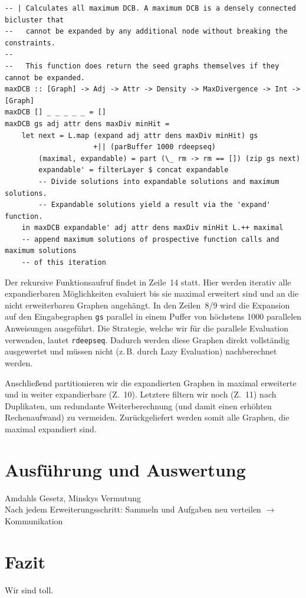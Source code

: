 \documentclass[a4paper]{scrartcl}
\begin{document}
\begin{lstlisting}[caption={Die maxDCB-Funktion},label=lst:maxDCB]
-- | Calculates all maximum DCB. A maximum DCB is a densely connected bicluster that
--   cannot be expanded by any additional node without breaking the constraints.
--   
--   This function does return the seed graphs themselves if they cannot be expanded.
maxDCB :: [Graph] -> Adj -> Attr -> Density -> MaxDivergence -> Int -> [Graph]
maxDCB [] _ _ _ _ _ = []
maxDCB gs adj attr dens maxDiv minHit =
    let next = L.map (expand adj attr dens maxDiv minHit) gs
                     +|| (parBuffer 1000 rdeepseq)
        (maximal, expandable) = part (\_ rm -> rm == []) (zip gs next)
        expandable' = filterLayer $ concat expandable
        -- Divide solutions into expandable solutions and maximum solutions.
        -- Expandable solutions yield a result via the 'expand' function.
    in maxDCB expandable' adj attr dens maxDiv minHit L.++ maximal
    -- append maximum solutions of prospective function calls and maximum solutions
    -- of this iteration
\end{lstlisting}

Der rekursive Funktionsaufruf findet in Zeile~14 statt. Hier werden iterativ alle expandierbaren Möglichkeiten evaluiert bis sie maximal erweitert sind und an die nicht erweiterbaren Graphen angehängt. In den Zeilen~8/9 wird die Expansion auf den Eingabegraphen \texttt{gs} parallel in einem Puffer von höchstens 1000 parallelen Anweisungen ausgeführt. Die Strategie, welche wir für die parallele Evaluation verwenden, lautet \texttt{rdeepseq}. Dadurch werden diese Graphen direkt vollständig ausgewertet und müssen nicht (z.\,B. durch Lazy Evaluation) nachberechnet werden.\par
\medskip
Anschließend partitionieren wir die expandierten Graphen in maximal erweiterte und in weiter expandierbare (Z.~10). Letztere filtern wir noch (Z.~11) nach Duplikaten, um redundante Weiterberechnung (und damit einen erhöhten Rechenaufwand) zu vermeiden. Zurückgeliefert werden somit alle Graphen, die maximal expandiert sind. \par


\section{Ausführung und Auswertung}
Amdahls Gesetz, Minskys Vermutung\\
Nach jedem Erweiterungsschritt: Sammeln und Aufgaben neu verteilen $\rightarrow$ Kommunikation

\section{Fazit}
Wir sind toll.

\newpage
\printbibliography[heading=bibintoc]
\end{document}
